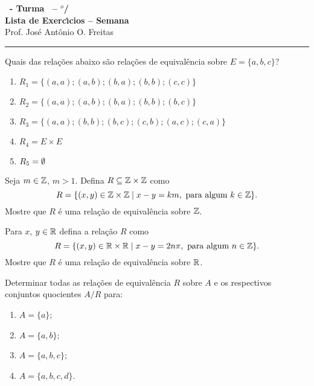 \documentclass[12pt]{exam}
\begin{document}
    \begin{center}
    {\Large\bf \disciplina\ - Turma \turma\ -- \semestre$^{o}$/\ano} \\ \vspace{9pt} {\large\bf
        Lista de Exerc{\'\i}cios -- Semana \numerosemana}\\ \vspace{9pt} Prof. Jos{\'e} Ant{\^o}nio O. Freitas
    \end{center}
    \hrule

    \vspace{.6cm}

    \questao{} Quais das rela{\c c}{\~o}es abaixo s{\~a}o rela{\c c}{\~o}es de equival{\^e}ncia sobre $E = \{a,b,c\}$?
    \begin{enumerate}[label={\alph*})]
        \item $R_1 = \{(a,a);(a,b);(b,a);(b,b);(c,c)\}$

        \item $R_2 = \{(a,a);(a,b);(b,a);(b,b);(b,c)\}$

        \item $R_3 = \{(a,a);(b,b);(b,c);(c,b);(a,c);(c,a)\}$

        \item $R_4 = E \times E$

        \item $R_5 = \emptyset$
    \end{enumerate}

    \vspace{.3cm}

    \questao{} Seja $m \in \mathbb{Z}$, $m > 1$. Defina $R \subseteq \mathbb{Z}\times\mathbb{Z}$ como
    \[
      R = \{(x,y) \in \mathbb{Z}\times\mathbb{Z} \mid x - y = km, \mbox{ para algum } k \in \mathbb{Z}\}.
    \]
    Mostre que $R$ \'e uma rela\c{c}\~ao de equival\^encia sobre $\mathbb{Z}$.

    \vspace{.3cm}

    \questao{} Para $x$, $y \in \mathbb{R}$ defina a relação $R$ como
    \[
        R = \{(x,y) \in \mathbb{R} \times \mathbb{R} \mid x - y = 2n\pi, \mbox{ para algum } n \in \mathbb{Z}\}.
    \]
    Mostre que $R$ é uma relação de equivalência sobre $\mathbb{R}$.

    \vspace{.3cm}

    \questao{} Determinar todas as rela{\c c}{\~o}es de equival{\^e}ncia
    $R$ sobre $A$ e os respectivos conjuntos quocientes $A/R$ para:
    \begin{enumerate}[label={\alph*})]
        \item $A=\{a\}$;

        \item $A=\{a,b\}$;

        \item $A=\{a,b,c\}$;

        \item $A=\{a,b,c,d\}$.
    \end{enumerate}
\end{document}
